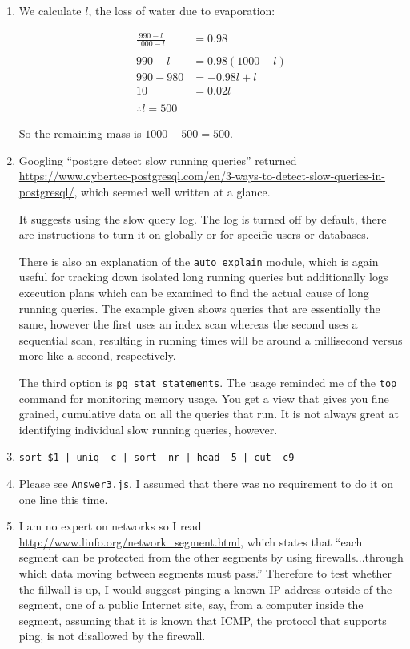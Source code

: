 \documentclass{article}
\begin{document}
\begin{enumerate}[start=0]
\item We calculate $l$, the loss of water due to evaporation:

\begin{align*}
\frac{990-l}{1000-l} & = 0.98 \\
\\
990 - l & = 0.98(1000-l) \\
990 - 980 & = -0.98l + l \\
10 & = 0.02l\\
\\
\therefore l = 500
\end{align*}

So the remaining mass is $1000 - 500 = 500$.

\item Googling ``postgre detect slow running queries'' returned \url{https://www.cybertec-postgresql.com/en/3-ways-to-detect-slow-queries-in-postgresql/}, which seemed well written at a glance. 

It suggests using the slow query log. The log is turned off by default, there are instructions to turn it on globally or for specific users or databases. 

There is also an explanation of the \texttt{auto\_explain} module, which is again useful for tracking down isolated long running queries but additionally logs execution plans which can be examined to find the actual cause of long running queries. The example given shows queries that are essentially the same, however the first uses an index scan whereas the second uses a sequential scan, resulting in running times will be around a millisecond versus more like a second, respectively.

The third option is \texttt{pg\_stat\_statements}. The usage reminded me of the \texttt{top} command for monitoring memory usage. You get a view that gives you fine grained, cumulative data on all the queries that run. It is not always great at identifying individual slow running queries, however.

\item \texttt{sort \$1 | uniq -c | sort -nr | head -5 | cut -c9-}

\item Please see \texttt{Answer3.js}. I assumed that there was no requirement to do it on one line this time.

\item I am no expert on networks so I read \url{http://www.linfo.org/network_segment.html}, which states that ``each segment can be protected from the other segments by using firewalls...through which data moving between segments must pass.'' Therefore to test whether the fillwall is up, I would suggest pinging a known IP address outside of the segment, one of a public Internet site, say, from a computer inside the segment, assuming that it is known that ICMP, the protocol that supports ping, is not disallowed by the firewall.


\end{enumerate}
\end{document}
